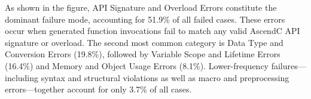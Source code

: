 As shown in the figure, API Signature and Overload Errors constitute the dominant failure mode, accounting for 51.9\% of all failed cases. These errors occur when generated function invocations fail to match any valid AscendC API signature or overload. The second most common category is Data Type and Conversion Errors (19.8\%), followed by Variable Scope and Lifetime Errors (16.4\%) and Memory and Object Usage Errors (8.1\%). Lower-frequency failures—including syntax and structural violations as well as macro and preprocessing errors—together account for only 3.7\% of all cases.

